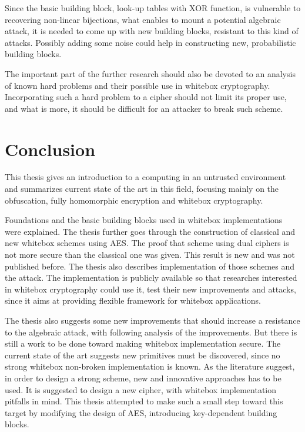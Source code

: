 \documentclass[11pt,oneside,final]{fithesis2}
\begin{document}
    Since the basic building block, look-up tables with XOR function, is vulnerable to recovering non-linear bijections, what enables to mount 
    a potential algebraic attack, it is needed to come up with new building blocks, resistant to this kind of attacks. Possibly adding some noise could help 
    in constructing new, probabilistic building blocks.
    
    The important part of the further research should also be devoted to an analysis of known hard problems and their possible use in whitebox cryptography.
    Incorporating such a hard problem to a cipher should not limit its proper use, and what is more, it should be difficult for an attacker to break
    such scheme.     

\chapter{Conclusion}\label{sec:conclusion}   
    This thesis gives an introduction to a computing in an untrusted environment and summarizes current state of the art in this field, focusing 
    mainly on the obfuscation, fully homomorphic encryption and whitebox cryptography.
    
    Foundations and the basic building blocks used in whitebox implementations were explained. The thesis further goes through 
    the construction of classical and new whitebox schemes using AES. The proof that scheme using dual ciphers is not more secure than the classical one 
    was given. This result is new and was not published before. The thesis also describes implementation of those schemes and 
    the attack. The implementation is publicly available so that researches interested in whitebox cryptography could use it, test their new improvements and
    attacks, since it aims at providing flexible framework for whitebox applications.
    
    The thesis also suggests some new improvements that should increase a resistance to the algebraic attack, with following analysis of the improvements. But
    there is still a work to be done toward making whitebox implementation secure. The current state of the art suggests new primitives must be discovered, since
    no strong whitebox non-broken implementation is known. As the literature \citep{Billet:2004:CWB:2080787.2080809, wyseurPhd} suggest, in order 
    to design a strong scheme, new and innovative approaches has to be used. It is suggested to design a new cipher, with whitebox implementation pitfalls in mind.
    This thesis attempted to make such a small step toward this target by modifying the design of AES, introducing key-dependent building blocks.
    
\end{document}
